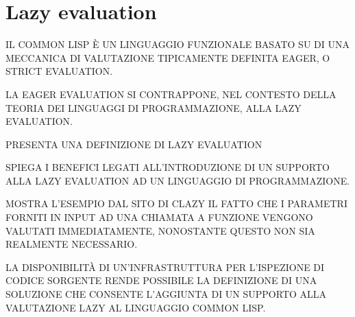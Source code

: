 \section{Lazy evaluation}
\label{lazy-evaluation}

IL COMMON LISP È UN LINGUAGGIO FUNZIONALE BASATO SU DI UNA MECCANICA DI
VALUTAZIONE TIPICAMENTE DEFINITA EAGER, O STRICT EVALUATION.

LA EAGER EVALUATION SI CONTRAPPONE, NEL CONTESTO DELLA TEORIA DEI LINGUAGGI DI
PROGRAMMAZIONE, ALLA LAZY EVALUATION.

PRESENTA UNA DEFINIZIONE DI LAZY EVALUATION

SPIEGA I BENEFICI LEGATI ALL'INTRODUZIONE DI UN SUPPORTO ALLA LAZY EVALUATION AD
UN LINGUAGGIO DI PROGRAMMAZIONE.

MOSTRA L'ESEMPIO DAL SITO DI CLAZY IL FATTO CHE I PARAMETRI FORNITI IN INPUT AD
UNA CHIAMATA A FUNZIONE VENGONO VALUTATI IMMEDIATAMENTE, NONOSTANTE QUESTO NON
SIA REALMENTE NECESSARIO.

LA DISPONIBILITÀ DI UN'INFRASTRUTTURA PER L'ISPEZIONE DI CODICE SORGENTE RENDE
POSSIBILE LA DEFINIZIONE DI UNA SOLUZIONE CHE CONSENTE L'AGGIUNTA DI UN SUPPORTO
ALLA VALUTAZIONE LAZY AL LINGUAGGIO COMMON LISP.
